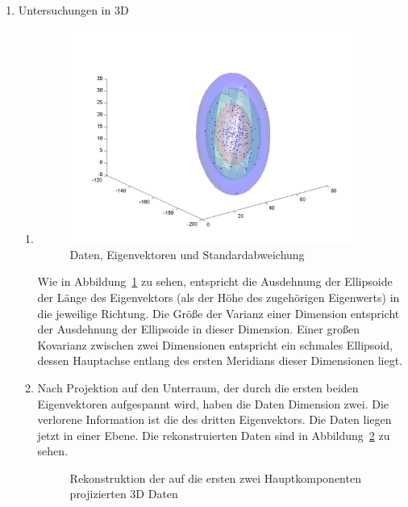 \documentclass[]{report}
\newlength\figureheight
\newlength\figurewidth
\begin{document}
\begin{enumerate}
		\item Untersuchungen in 3D
		\begin{enumerate}
			\item
				\setlength\figurewidth{\textwidth}
				\begin{figure}[tbp!]
					\centering
					\includegraphics[height=7cm]{figures/pca3d.png}
					\caption{Daten, Eigenvektoren und Standardabweichung} 
					\label{fig:daten3d}
				\end{figure}
			Wie in Abbildung~\ref{fig:daten3d} zu sehen, entspricht die Ausdehnung der Ellipsoide der Länge des Eigenvektors (als der Höhe des zugehörigen Eigenwerts) in die jeweilige Richtung. Die Größe der Varianz einer Dimension entspricht der Ausdehnung der Ellipsoide in dieser Dimension. Einer großen Kovarianz zwischen zwei Dimensionen entspricht ein schmales Ellipsoid, dessen Hauptachse entlang des ersten Meridians dieser Dimensionen liegt.
			\item
			Nach Projektion auf den Unterraum, der durch die ersten beiden Eigenvektoren aufgespannt wird, haben die Daten Dimension zwei. Die verlorene Information ist die des dritten Eigenvektors. Die Daten liegen jetzt in einer Ebene. Die rekonstruierten Daten sind in Abbildung~\ref{fig:3D projection and reconstruction} zu sehen.
			\setlength\figureheight{7cm}
			\setlength\figurewidth{\textwidth}
			\begin{figure}[tbp!]
				\centering
				
				\caption{Rekonstruktion der auf die ersten zwei Hauptkomponenten projizierten 3D Daten} 
				\label{fig:3D projection and reconstruction}
			\end{figure}
		\end{enumerate}
		

\end{enumerate}
\end{document}
